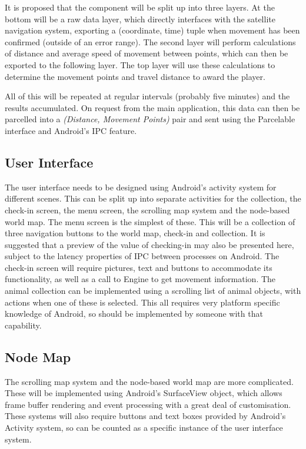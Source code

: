 \documentclass[12pt,a4paper,twoside]{article}
\begin{document}
It is proposed that the component will be split up into three layers.
At the bottom will be a raw data layer, which directly interfaces with the satellite navigation system, exporting a (coordinate, time) tuple when movement has been confirmed (outside of an error range).
The second layer will perform calculations of distance and average speed of movement between points, which can then be exported to the following layer.
The top layer will use these calculations to determine the movement points and travel distance to award the player.


All of this will be repeated at regular intervals (probably five minutes) and the results accumulated.
On request from the main application, this data can then be parcelled into a \textit{(Distance, Movement Points)} pair and sent using the Parcelable interface and Android's IPC feature.

\subsection{User Interface}
The user interface needs to be designed using Android's activity system for different scenes.
This can be split up into separate activities for the collection, the check-in screen, the menu screen, the scrolling map system and the node-based world map.
The menu screen is the simplest of these.
This will be a collection of three navigation buttons to the world map, check-in and collection.
It is suggested that a preview of the value of checking-in may also be presented here, subject to the latency properties of IPC between processes on Android.
The check-in screen will require pictures, text and buttons to accommodate its functionality, as well as a call to Engine to get movement information.
The animal collection can be implemented using a scrolling list of animal objects, with actions when one of these is selected.
This all requires very platform specific knowledge of Android, so should be implemented by someone with that capability.

\subsection{Node Map}
The scrolling map system and the node-based world map are more complicated.
These will be implemented using Android's SurfaceView object, which allows frame buffer rendering and event processing with a great deal of customisation.
These systems will also require buttons and text boxes provided by Android's Activity system, so can be counted as a specific instance of the user interface system.
\end{document}
